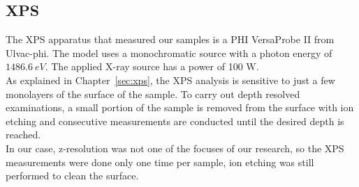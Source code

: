 \subsection{XPS}
\label{subsec:xps_setup}
The XPS apparatus that measured our samples is a PHI VersaProbe II from Ulvac-phi. The model uses a monochromatic  source with a photon energy of $1486.6 \: eV$. The applied X-ray source has a power of 100 W.
\\
As explained in Chapter~\ref{sec:xps}, the XPS analysis is sensitive to just a few monolayers of the surface of the sample. To carry out depth resolved examinations, a small portion of the sample is removed from the surface with ion etching and consecutive measurements are conducted until the desired depth is reached.
\\
In our case, z-resolution was not one of the focuses of our research, so the XPS measurements were done only one time per sample, ion etching was still performed to clean the surface.

